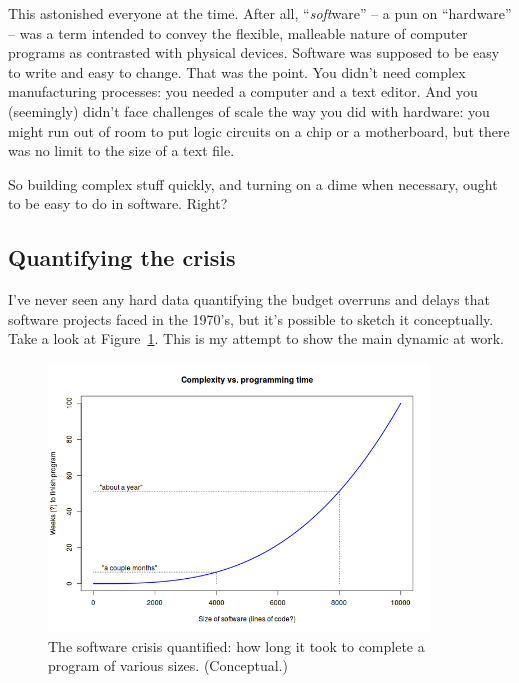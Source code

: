 This astonished everyone at the time. After all, ``\textit{soft}ware'' -- a
pun on ``hardware'' -- was a term intended to convey the flexible, malleable
nature of computer programs as contrasted with physical devices. Software was
supposed to be easy to write and easy to change. That was the point. You
didn't need complex manufacturing processes: you needed a computer and
a text editor. And you (seemingly) didn't face challenges of scale the way you
did with hardware: you might run out of room to put logic circuits on a chip
or a motherboard, but there was no limit to the size of a text file. 

So building complex stuff quickly, and turning on a dime when necessary, ought
to be easy to do in software. Right?

\subsection{Quantifying the crisis}

I've never seen any hard data quantifying the budget overruns and delays that
software projects faced in the 1970's, but it's possible to sketch it
conceptually. Take a look at Figure~\ref{fig:complexityCurve}. This is
my attempt to show the main dynamic at work.

\begin{figure}[ht]
\centering
\includegraphics[width=0.9\textwidth]{complexityCurve.png}
\caption{The software crisis quantified: how long it took to complete a
program of various sizes. (Conceptual.)}
\label{fig:complexityCurve}
\end{figure}

